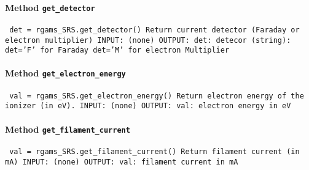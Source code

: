 \paragraph{Method \texttt{get_detector}}
\vspace{1ex}
\texttt{\newline
det = rgams_SRS.get_detector()\newline
\newline
Return current detector (Faraday or electron multiplier)\newline
\newline
INPUT:\newline
(none)\newline
\newline
OUTPUT:\newline
det: detecor (string):\newline
det='F' for Faraday\newline
det='M' for electron Multiplier\newline
\newline
}

\paragraph{Method \texttt{get_electron_energy}}
\vspace{1ex}
\texttt{\newline
val = rgams_SRS.get_electron_energy()\newline
\newline
Return electron energy of the ionizer (in eV).\newline
\newline
INPUT:\newline
(none)\newline
\newline
OUTPUT:\newline
val: electron energy in eV\newline
\newline
}

\paragraph{Method \texttt{get_filament_current}}
\vspace{1ex}
\texttt{\newline
val = rgams_SRS.get_filament_current()\newline
\newline
Return filament current (in mA)\newline
\newline
INPUT:\newline
(none)\newline
\newline
OUTPUT:\newline
val: filament current in mA\newline
\newline
}

